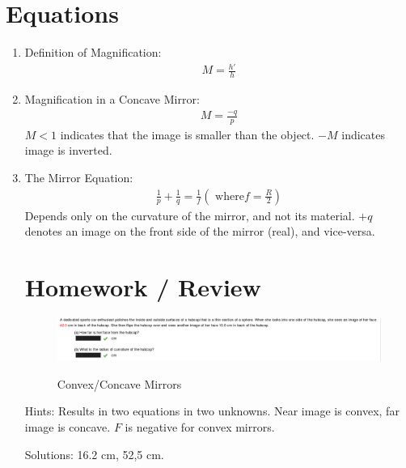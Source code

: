 \documentclass[a4paper,10pt]{report}
\begin{document}
\section{Equations}
\begin{enumerate}
  \item
  Definition of Magnification:
  \begin{align*}
   M = \frac{h'}{h}
  \end{align*}

  \item
  Magnification in a Concave Mirror:
  \begin{align*}
   M = \frac{-q}{p}
  \end{align*}
  $M<1$ indicates that the image is smaller than the object. $-M$ indicates image is inverted.

  \item
  The Mirror Equation:
  \begin{align*}
   \frac{1}{p} + \frac{1}{q} = \frac{1}{f} (\text{ where} f = \frac{R}{2})
  \end{align*}
  Depends only on the curvature of the mirror, and not its material.
  $+q$ denotes an image on the front side of the mirror (real), and vice-versa.

\section{Homework / Review}

\begin{figure}[h!]
  \begin{centering}
  \begin{center}
  \includegraphics[width=\linewidth]{./hw5.png}
  \label{fig:hw_concave_convex}
  \caption{Convex/Concave Mirrors}
  \end{center}
  \par\end{centering}
  \end{figure}
  Hints: Results in two equations in two unknowns. Near image is convex, far image is concave. $F$ is negative for convex mirrors.

  Solutions: 16.2 cm, 52,5 cm.


\end{enumerate}
\end{document}
